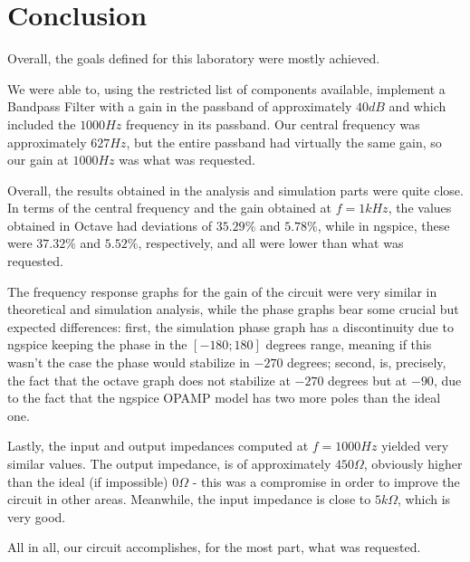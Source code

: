 \section{Conclusion}
\label{sec:conclusion}


Overall, the goals defined for this laboratory were mostly achieved.

We were able to, using the restricted list of components available, implement a Bandpass Filter with a gain in the passband of approximately $40 dB$ and which included the $1000 Hz$ frequency in its passband. Our central frequency was approximately $627 Hz$, but the entire passband had virtually the same gain, so our gain at $1000 Hz$ was what was requested.

Overall, the results obtained in the analysis and simulation parts were quite close. In terms of the central frequency and the gain obtained at $f = 1 kHz$, the values obtained in Octave had deviations of $35.29 \%$ and $5.78 \%$, while in ngspice, these were $37.32\%$ and $5.52 \%$, respectively, and all were lower than what was requested.

The frequency response graphs for the gain of the circuit were very similar in theoretical and simulation analysis, while the phase graphs bear some crucial but expected differences: first, the simulation phase graph has a discontinuity due to ngspice keeping the phase in the $[-180; 180]$ degrees range, meaning if this wasn't the case the phase would stabilize in $-270$ degrees; second, is, precisely, the fact that the octave graph does not stabilize at $-270$ degrees but at $-90$, due to the fact that the ngspice OPAMP model has two more poles than the ideal one.

Lastly, the input and output impedances computed at $f = 1000 Hz$ yielded very similar values. The output impedance, is of approximately $450 \Omega$, obviously higher than the ideal (if impossible) $0 \Omega$ - this was a compromise in order to improve the circuit in other areas. Meanwhile, the input impedance is close to $5 k\Omega$, which is very good.

All in all, our circuit accomplishes, for the most part, what was requested.
